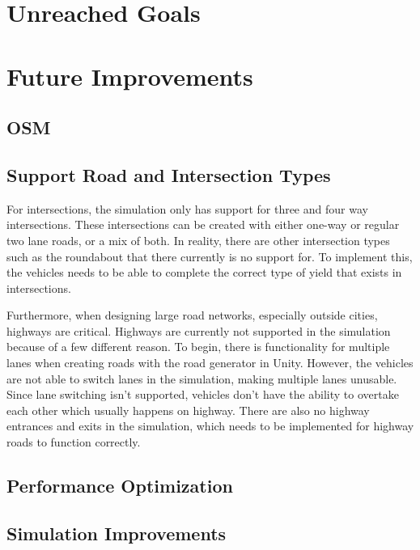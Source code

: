 
\section{Unreached Goals}

\section{Future Improvements}

    \subsection{OSM}

    \subsection{Support Road and Intersection Types}

    For intersections, the simulation only has support for three and four way intersections. These intersections can be created with either one-way or regular two lane roads, or a mix of both. In reality, there are other intersection types such as the roundabout that there currently is no support for. To implement this, the vehicles needs to be able to complete the correct type of yield that exists in intersections.

    Furthermore, when designing large road networks, especially outside cities, highways are critical. Highways are currently not supported in the simulation because of a few different reason. To begin, there is functionality for multiple lanes when creating roads with the road generator in Unity. However, the vehicles are not able to switch lanes in the simulation, making multiple lanes unusable. Since lane switching isn't supported, vehicles don't have the ability to overtake each other which usually happens on highway. There are also no highway entrances and exits in the simulation, which needs to be implemented for highway roads to function correctly.

    

    \subsection{Performance Optimization}

    \subsection{Simulation Improvements}

